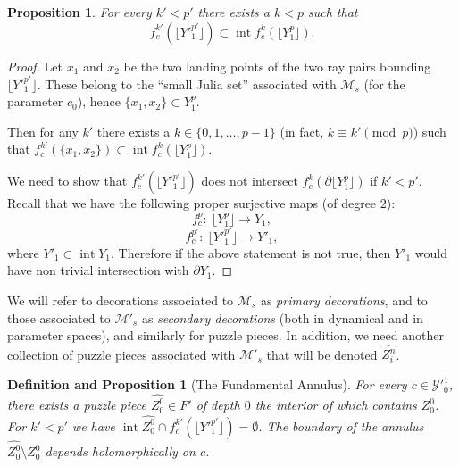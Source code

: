 \documentclass[12pt,a4paper]{amsart}
\newtheorem{proposition}[theorem]{Proposition}
\newtheorem{defprop}[theorem]{Definition and Proposition}
\newcommand{\MM}{\mathcal M}
\newcommand{\YY}{\mathcal Y}
\newcommand{\intr}{\operatorname{int}}
\begin{document}
\begin{proposition}
\label{Prop:SubStrip}
 For every $k'<p'$ there exists a $k<p$ such that
 \begin{equation}
 \label{StripeIncl}
 f^{k'}_c\left(\lfloor Y'^{p'}_1\rfloor
 \right)\subset \intr  f^{k}_c\left(\lfloor Y^{p}_1\rfloor
 \right).
 \end{equation}

\end{proposition}
\begin{proof}
Let $x_1$ and $x_2$ be the two landing points of the two ray pairs
bounding $\lfloor Y'^{p'}_1 \rfloor$. These belong to the ``small
Julia set'' associated with $\MM_s$ (for the parameter $c_0$), hence
$\{x_1,x_2\}\subset Y^p_1$.


Then for any $k'$ there exists a $k\in\{0,1,\dots,p-1\}$ (in fact,
$k\equiv k' \pmod p$) such that $f^{k'}_c\left(\{x_1,x_2\}
 \right)\subset \intr  f^{k}_c\left(\lfloor Y^{p}_1\rfloor
 \right)$.

We need to show that $f^{k'}_c\left(\lfloor Y'^{p'}_1\rfloor
 \right)$ does not intersect
 $f^{k}_c\left(\partial\lfloor Y^{p}_1\rfloor
 \right)$ if $k'<p'$.
Recall that we have the following proper surjective maps (of degree
$2$):
$$f_c^{p}:\ \lfloor Y^{p}_1 \rfloor\rightarrow Y_1,$$
$$f_c^{p'}:\ \lfloor Y'^{p'}_1 \rfloor\rightarrow Y'_1,$$
where $Y'_1\subset\intr Y_1$. Therefore if the above statement is
not true, then $Y'_1$ would have non trivial intersection with
$\partial Y_1$.
\end{proof}


We will refer to decorations associated to $\MM_s$ as \emph{primary
decorations},
  and to those associated to $\MM'_s$
as \emph{secondary decorations} (both in dynamical and in parameter
spaces),
  and similarly for puzzle pieces.
In addition, we need another collection of puzzle pieces associated
with $\MM'_s$ that will be denoted $\widehat{Z^n_i}$.






\begin{defprop}[The Fundamental Annulus]
\label{defprop1}
   For every $c\in\YY'^1_0$, there exists a puzzle piece $\widehat{Z^0_0}\in F'$ of depth $0$
   the interior of which contains $Z^0_0$.
For $k'<p'$ we have $\intr\widehat{Z^0_0}\cap f^{k'}_c(\lfloor
Y'^{p'}_1\rfloor) = \emptyset$. The boundary of the annulus
$\widehat{Z^0_0}\setminus
   Z^0_0$ depends holomorphically on $c$.

\end{defprop}
\end{document}
